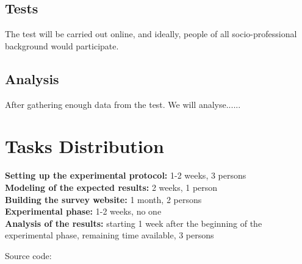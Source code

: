 \documentclass[12pt]{article}
\begin{document}
\subsection{Tests}
The test will be carried out online, and ideally, people of all socio-professional background would participate.

\subsection{Analysis}
After gathering enough data from the test. We will analyse......


\section{Tasks Distribution}

\textbf{Setting up the experimental protocol:} 1-2 weeks, 3 persons \\
\textbf{Modeling of the expected results:} 2 weeks, 1 person \\
\textbf{Building the survey website:} 1 month, 2 persons \\
\textbf{Experimental phase:} 1-2 weeks, no one \\
\textbf{Analysis of the results:} starting 1 week after the beginning of the experimental phase, remaining time available, 3 persons


\newpage
\begin{thebibliography}{12}
Source code: 

\end{thebibliography}
\end{document}

